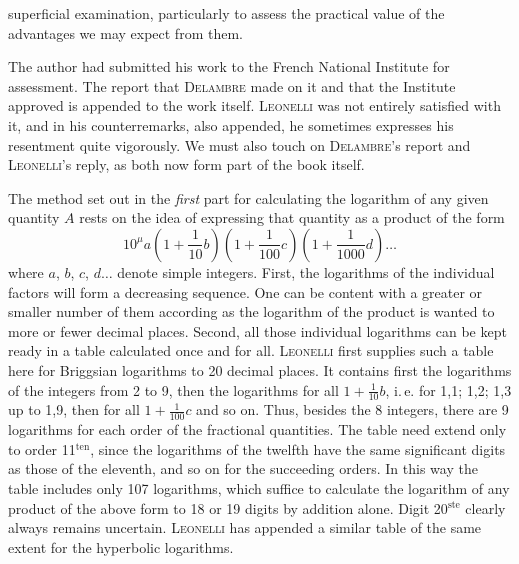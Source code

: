 %
superficial examination, particularly to assess the practical value of the advantages we may expect from them.

The author had submitted his work to the French National Institute for assessment. The report that \textsc{Delambre} made on it and that the Institute approved is appended to the work itself. \textsc{Leonelli} was not entirely satisfied with it, and in his counterremarks, also appended, he sometimes expresses his resentment quite vigorously. We must also touch on \textsc{Delambre}'s report and \textsc{Leonelli}'s reply, as both now form part of the book itself.

The method set out in the \emph{first} part for calculating the logarithm of any given quantity $A$ rests on the idea of expressing that quantity as a product of the form
\[
10^{\mu} a \left(1+\frac{1}{10} b\right)\left(1+\frac{1}{100} c\right)\left(1+\frac{1}{1000} d\right)\ldots
\]
where $a$, $b$, $c$, $d\ldots$ denote simple integers. First, the logarithms of the individual factors will form a decreasing sequence. One can be content with a greater or smaller number of them according as the logarithm of the product is wanted to more or fewer decimal places. Second, all those individual logarithms can be kept ready in a table calculated once and for all. \textsc{Leonelli} first supplies such a table here for Briggsian logarithms to 20 decimal places. It contains first the logarithms of the integers from 2 to 9, then the logarithms for all $1+\frac{1}{10} b$, i.\,e. for 1,1; 1,2; 1,3 up to 1,9, then for all $1+\frac{1}{100} c$ and so on. Thus, besides the 8 integers, there are 9 logarithms for each order of the fractional quantities. The table need extend only to order 11$^{\mathrm{ten}}$, since the logarithms of the twelfth have the same significant digits as those of the eleventh, and so on for the succeeding orders. In this way the table includes only 107 logarithms, which suffice to calculate the logarithm of any product of the above form to 18 or 19 digits by addition alone. Digit 20$^{\mathrm{ste}}$ clearly always remains uncertain. \textsc{Leonelli} has appended a similar table of the same extent for the hyperbolic logarithms.


